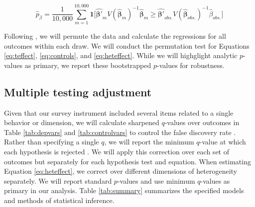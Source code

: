 \documentclass[11pt, a4paper]{article}\usepackage[]{graphicx}\usepackage[]{color}
\begin{document}
        \begin{equation} \label{eq:exactp}
            \hat{p}_{\beta} =  \frac{1}{10,000}\sum_{m=1}^{10,000} \mathbf{1} \Big [ \mathbf{\hat{\beta'}}_m V(\mathbf{\hat{\beta}}_m)^{-1} \mathbf{\hat{\beta}}_m \geq \mathbf{\hat{\beta'}}_{obs.} V(\mathbf{\hat{\beta}}_{obs.})^{-1} \hat{\beta}_{obs.} \Big ]
        \end{equation}

        Following \textcite{young_channeling_2015}, we will permute the data and calculate the regressions for all outcomes within each draw. We will conduct the permutation test for Equations \ref{eq:teffect}, \ref{eq:controls}, and \ref{eq:heteffect}. While we will highglight analytic $p$-values as primary, we report these bootstrapped $p$-values for robustness.

    \subsection{Multiple testing adjustment}

        Given that our survey instrument included several items related to a single behavior or dimension, we will calculate sharpened $q$-values over outcomes in Table \ref{tab:depvars} and \ref{tab:controlvars} to control the false discovery rate \parencite{benjamini_adaptive_2006}. Rather than specifying a single $q$, we will report the minimum $q$-value at which each hypothesis is rejected \parencite{anderson_multiple_2008}. We will apply this correction over each set of outcomes but separately for each hypothesis test and equation. When estimating Equation \ref{eq:heteffect}, we correct over different dimensions of heterogeneity separately. We will report standard $p$-values and use minimum $q$-values as primary in our analysis. Table \ref{tab:summary} summarizes the specified models and methods of statistical inference.

\end{document}
